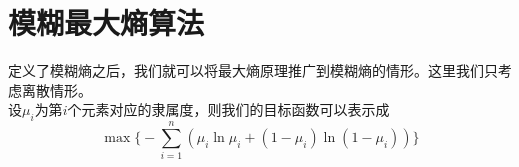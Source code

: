 \newpage
\section{模糊最大熵算法}
定义了模糊熵之后，我们就可以将最大熵原理推广到模糊熵的情形。这里我们只考虑离散情形。\\
设$\mu_i$为第$i$个元素对应的隶属度，则我们的目标函数可以表示成
\[
    \max \biggl\{-\sum_{i=1}^{n}\left(\mu_i \ln \mu_i+\left(1-\mu_i\right) \ln \left(1-\mu_i\right)\right)\biggr\}
\]